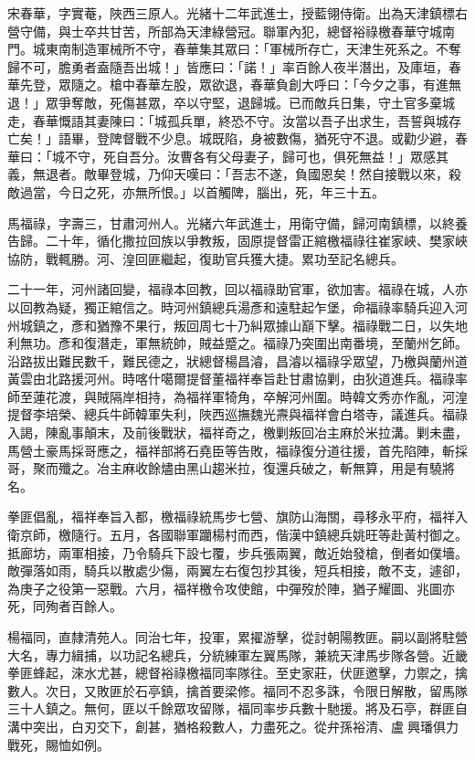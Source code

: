 \begin{pinyinscope}
宋春華，字實菴，陜西三原人。光緒十二年武進士，授藍翎侍衛。出為天津鎮標右營守備，與士卒共甘苦，所部為天津綠營冠。聯軍內犯，總督裕祿檄春華守城南門。城東南制造軍械所不守，春華集其眾曰：「軍械所存亡，天津生死系之。不奪歸不可，膽勇者盍隨吾出城！」皆應曰：「諾！」率百餘人夜半潛出，及庫垣，春華先登，眾隨之。槍中春華左股，眾欲退，春華負創大呼曰：「今夕之事，有進無退！」眾爭奪敵，死傷甚眾，卒以守堅，退歸城。已而敵兵日集，守土官多棄城走，春華慨語其妻陳曰：「城孤兵單，終恐不守。汝當以吾子出求生，吾誓與城存亡矣！」語畢，登陴督戰不少息。城既陷，身被數傷，猶死守不退。或勸少避，春華曰：「城不守，死自吾分。汝曹各有父母妻子，歸可也，俱死無益！」眾感其義，無退者。敵畢登城，乃仰天嘆曰：「吾志不遂，負國恩矣！然自接戰以來，殺敵過當，今日之死，亦無所恨。」以首觸陴，腦出，死，年三十五。

馬福祿，字壽三，甘肅河州人。光緒六年武進士，用衛守備，歸河南鎮標，以終養告歸。二十年，循化撒拉回族以爭教叛，固原提督雷正綰檄福祿往崔家峽、樊家峽協防，戰輒勝。河、湟回匪繼起，復助官兵獲大捷。累功至記名總兵。

二十一年，河州諸回變，福祿本回教，回以福祿助官軍，欲加害。福祿在城，人亦以回教為疑，獨正綰信之。時河州鎮總兵湯彥和遠駐起乍堡，命福祿率騎兵迎入河州城鎮之，彥和猶豫不果行，叛回周七十乃糾眾據山巔下擊。福祿戰二日，以失地利無功。彥和復潛走，軍無統帥，賊益蹙之。福祿乃突圍出南番境，至蘭州乞師。沿路拔出難民數千，難民德之，狀總督楊昌濬，昌濬以福祿孚眾望，乃檄與蘭州道黃雲由北路援河州。時喀什噶爾提督董福祥奉旨赴甘肅協剿，由狄道進兵。福祿率師至蓮花渡，與賊隔岸相持，為福祥軍犄角，卒解河州圍。時韓文秀亦作亂，河湟提督李培榮、總兵牛師韓軍失利，陜西巡撫魏光燾與福祥會白塔寺，議進兵。福祿入謁，陳亂事顛末，及前後戰狀，福祥奇之，檄剿叛回冶主麻於米拉溝。剿未盡，馬營土豪馬採哥應之，福祥部將石堯臣等告敗，福祿復分道往援，首先陷陣，斬採哥，聚而殲之。冶主麻收餘燼由黑山趨米拉，復還兵破之，斬無算，用是有驍將名。

拳匪倡亂，福祥奉旨入都，檄福祿統馬步七營、旗防山海關，尋移永平府，福祥入衛京師，檄隨行。五月，各國聯軍躪楊村而西，偕漢中鎮總兵姚旺等赴黃村御之。抵廊坊，兩軍相接，乃令騎兵下設七覆，步兵張兩翼，敵近始發槍，倒者如僕墻。敵彈落如雨，騎兵以散處少傷，兩翼左右復包抄其後，短兵相接，敵不支，遽卻，為庚子之役第一惡戰。六月，福祥檄令攻使館，中彈歿於陣，猶子耀圖、兆圖亦死，同殉者百餘人。

楊福同，直隸清苑人。同治七年，投軍，累擢游擊，從討朝陽教匪。嗣以副將駐營大名，專力緝捕，以功記名總兵，分統練軍左翼馬隊，兼統天津馬步隊各營。近畿拳匪蜂起，淶水尤甚，總督裕祿檄福同率隊往。至史家莊，伏匪邀擊，力禦之，擒數人。次日，又敗匪於石亭鎮，擒首要梁修。福同不忍多誅，令限日解散，留馬隊三十人鎮之。無何，匪以千餘眾攻留隊，福同率步兵數十馳援。將及石亭，群匪自溝中突出，白刃交下，創甚，猶格殺數人，力盡死之。從弁孫裕清、盧興璠俱力戰死，賜恤如例。


\end{pinyinscope}
